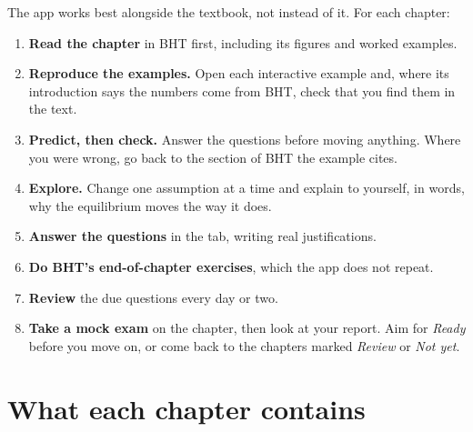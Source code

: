 The app works best alongside the textbook, not instead of it. For each chapter:
\begin{enumerate}
  \item \textbf{Read the chapter} in BHT first, including its figures and worked examples.
  \item \textbf{Reproduce the examples.} Open each interactive example and, where its introduction says the numbers come from BHT, check that you find them in the text.
  \item \textbf{Predict, then check.} Answer the  questions before moving anything. Where you were wrong, go back to the section of BHT the example cites.
  \item \textbf{Explore.} Change one assumption at a time and explain to yourself, in words, why the equilibrium moves the way it does.
  \item \textbf{Answer the questions} in the  tab, writing real justifications.
  \item \textbf{Do BHT's end-of-chapter exercises}, which the app does not repeat.
  \item \textbf{Review} the due questions every day or two.
  \item \textbf{Take a mock exam} on the chapter, then look at your report. Aim for \emph{Ready} before you move on, or come back to the chapters marked \emph{Review} or \emph{Not yet}.
\end{enumerate}

\section{What each chapter contains}

